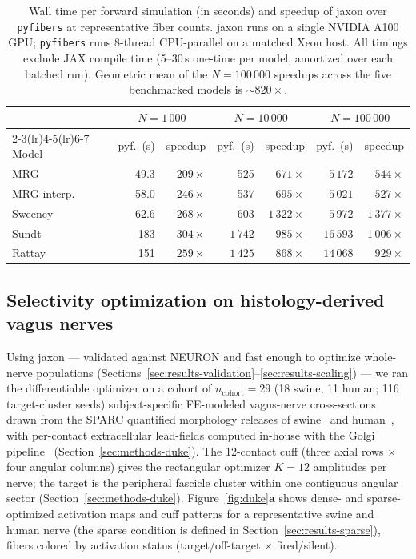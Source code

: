 \begin{table}[h]
  \centering
  \caption{Wall time per forward simulation (in seconds) and speedup
    of jaxon over \texttt{pyfibers} at representative fiber counts.
    jaxon runs on a single NVIDIA A100 GPU; \texttt{pyfibers} runs
    8-thread CPU-parallel on a matched Xeon host.  All timings exclude
    JAX compile time (5--30\,s one-time per model, amortized over each
    batched run).  Geometric mean of the $N=100\,000$ speedups across
    the five benchmarked models is $\sim 820\times$.}
  \label{tab:scaling}
  \small
  \begin{tabular}{lrrrrrr}
    \toprule
                            & \multicolumn{2}{c}{$N=1\,000$}
                            & \multicolumn{2}{c}{$N=10\,000$}
                            & \multicolumn{2}{c}{$N=100\,000$} \\
    \cmidrule(lr){2-3}\cmidrule(lr){4-5}\cmidrule(lr){6-7}
    Model      & pyf.\ (s) & speedup & pyf.\ (s) & speedup & pyf.\ (s) & speedup \\
    \midrule
    MRG        &  49.3 & $209\times$ &     525 & $671\times$ &  $5\,172$ &  $544\times$ \\
    MRG-interp.&  58.0 & $246\times$ &     537 & $695\times$ &  $5\,021$ &  $527\times$ \\
    Sweeney    &  62.6 & $268\times$ &     603 & $1\,322\times$ & $5\,972$ & $1\,377\times$ \\
    Sundt      &   183 & $304\times$ & $1\,742$ &   $985\times$ & $16\,593$ & $1\,006\times$ \\
    Rattay     &   151 & $259\times$ & $1\,425$ &   $868\times$ & $14\,068$ &   $929\times$ \\
    \bottomrule
  \end{tabular}
\end{table}

\subsection{Selectivity optimization on histology-derived vagus nerves}
\label{sec:results-duke}

Using jaxon --- validated against NEURON and fast enough to optimize
whole-nerve populations (Sections~\ref{sec:results-validation}--\ref{sec:results-scaling})
--- we ran the differentiable optimizer on a cohort of
$n_{\mathrm{cohort}} = 29$ (18 swine, 11 human; 116 target-cluster
seeds) subject-specific FE-modeled vagus-nerve cross-sections drawn
from the SPARC quantified morphology releases of
swine~\cite{pelot2020swineSPARC} and human~\cite{pelot2021humanSPARC},
with per-contact extracellular lead-fields computed in-house with the
Golgi pipeline~\cite{lung2026golgi}
(Section~\ref{sec:methods-duke}).  The 12-contact cuff
(three axial rows $\times$ four angular columns) gives the rectangular
optimizer $K=12$ amplitudes per nerve; the target is the peripheral
fascicle cluster within one contiguous angular sector
(Section~\ref{sec:methods-duke}).  Figure~\ref{fig:duke}\textbf{a}
shows dense- and sparse-optimized activation maps and cuff patterns for
a representative swine and human nerve (the sparse condition is defined
in Section~\ref{sec:results-sparse}), fibers colored by activation
status (target/off-target $\times$ fired/silent).

